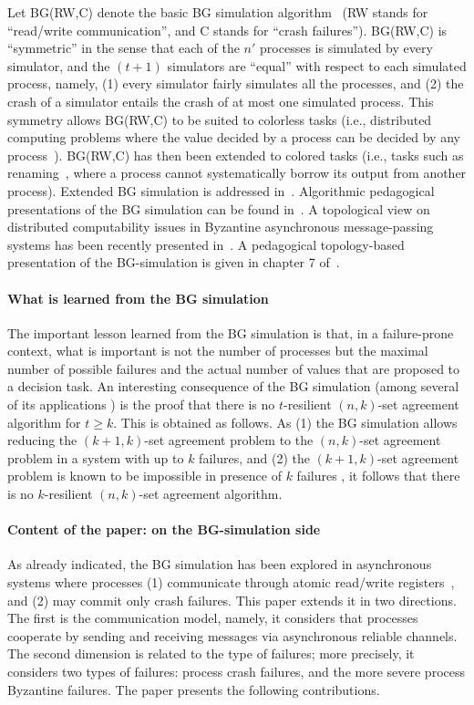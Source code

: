 \documentclass[11pt,letterpaper]{article}
\begin{document}
Let  BG(RW,C) denote the  basic BG simulation algorithm~\cite{BGLR01} (RW
stands for ``read/write communication'', and C stands for ``crash failures'').
BG(RW,C) is ``symmetric'' in  the sense that  each of the  $n'$
processes is  simulated by every simulator, and  the $(t+1)$ simulators
are ``equal'' with respect  to each  simulated process, namely,
(1)  every simulator fairly  simulates all the processes,
and (2) the  crash  of  a simulator  entails the crash  of  at most  one
simulated process.  This symmetry allows  BG(RW,C) to be
suited to  colorless tasks (i.e., distributed computing problems where the
value decided by a process can be decided by any process~\cite{HR97}).
BG(RW,C) has then been extended to colored tasks
(i.e.,  tasks such as renaming~\cite{ABDPR90}, where a process cannot
systematically borrow its output from another process).
Extended BG simulation is addressed in~\cite{G09,IR09}.
Algorithmic pedagogical
presentations of the BG simulation can be found in~\cite{HRR13,IR09}.
A topological view on distributed computability issues in Byzantine
asynchronous message-passing systems has been  recently
presented in~\cite{HKR14,MTH14}.  A pedagogical topology-based 
presentation of the BG-simulation is given in chapter 7 of~\cite{HKR14}. 



\paragraph{What is learned from the BG simulation}
The  important  lesson  learned  from the BG simulation is  that, in a
failure-prone  context,  what is important  is  not the number of processes
but  the maximal  number of   possible failures  and the  actual  number of
values that are proposed to a  decision task.
An interesting  consequence  of  the  BG simulation  (among  several
of its  applications  \cite{BGLR01})  is  the  proof  that  there is no
$t$-resilient $(n,k)$-set agreement algorithm for  $t  \geq k$.
This is obtained as follows.  As (1)
the BG simulation allows reducing the $(k+1,k)$-set agreement problem to the
$(n,k)$-set agreement problem in  a system with up to  $k$ failures,
and (2) the $(k+1,k)$-set agreement problem is known to be impossible
in presence of $k$ failures \cite{BG93,HS99,SZ00}, it follows that there is
no   $k$-resilient $(n,k)$-set agreement algorithm. 


\paragraph{Content of the paper: on the BG-simulation side}
As already indicated, the BG simulation has been explored in asynchronous
systems where processes
(1) communicate through atomic read/write registers~\cite{L86}, and
(2) may commit  only  crash failures. This paper extends it in two directions.
The first is the communication model, namely, it considers
that processes cooperate by sending and receiving messages
via asynchronous reliable channels.
The second dimension is related to the type of failures; more precisely, it
considers two  types of failures: process crash failures, and
the more severe  process Byzantine failures.
The  paper presents the following contributions.
\end{document}
